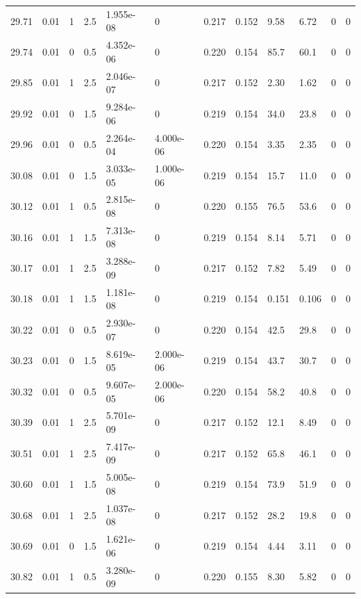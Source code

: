 \documentclass[preview]{standalone}
\begin{document}
{{{{{{{{{{{{{{\begin{tabular}{L{1.2cm}C{1.2cm} C{0.3cm}C{0.5cm} C{1.4cm}C{1.4cm} C{1.4cm}C{1.4cm} C{1.6cm}C{1.6cm} C{1.6cm}C{1.6cm}}
  29.71  &  0.01  & 1     & 2.5 &  1.955e-08  & 0  &  0.217&   0.152& 9.58 & 6.72   &  0 & 0  \\ 
  29.74  &  0.01  & 0     & 0.5 &  4.352e-06  & 0  &  0.220&   0.154& 85.7 & 60.1   &  0 & 0  \\ 
  29.85  &  0.01  & 1     & 2.5 &  2.046e-07  & 0  &  0.217&   0.152& 2.30 & 1.62   &  0 & 0  \\ 
  29.92  &  0.01  & 0     & 1.5 &  9.284e-06  & 0  &  0.219&   0.154& 34.0 & 23.8   &  0 & 0  \\ 
  29.96  &  0.01  & 0     & 0.5 &  2.264e-04  & 4.000e-06  &  0.220&   0.154& 3.35 & 2.35   &  0 & 0  \\ 
  30.08  &  0.01  & 0     & 1.5 &  3.033e-05  & 1.000e-06  &  0.219&   0.154& 15.7 & 11.0   &  0 & 0  \\ 
  30.12  &  0.01  & 1     & 0.5 &  2.815e-08  & 0  &  0.220&   0.155& 76.5 & 53.6   &  0 & 0  \\ 
  30.16  &  0.01  & 1     & 1.5 &  7.313e-08  & 0  &  0.219&   0.154& 8.14 & 5.71   &  0 & 0  \\ 
  30.17  &  0.01  & 1     & 2.5 &  3.288e-09  & 0  &  0.217&   0.152& 7.82 & 5.49   &  0 & 0  \\ 
  30.18  &  0.01  & 1     & 1.5 &  1.181e-08  & 0  &  0.219&   0.154& 0.151 & 0.106   &  0 & 0  \\ 
  30.22  &  0.01  & 0     & 0.5 &  2.930e-07  & 0  &  0.220&   0.154& 42.5 & 29.8   &  0 & 0  \\ 
  30.23  &  0.01  & 0     & 1.5 &  8.619e-05  & 2.000e-06  &  0.219&   0.154& 43.7 & 30.7   &  0 & 0  \\ 
  30.32  &  0.01  & 0     & 0.5 &  9.607e-05  & 2.000e-06  &  0.220&   0.154& 58.2 & 40.8   &  0 & 0  \\ 
  30.39  &  0.01  & 1     & 2.5 &  5.701e-09  & 0  &  0.217&   0.152& 12.1 & 8.49   &  0 & 0  \\ 
  30.51  &  0.01  & 1     & 2.5 &  7.417e-09  & 0  &  0.217&   0.152& 65.8 & 46.1   &  0 & 0  \\ 
  30.60  &  0.01  & 1     & 1.5 &  5.005e-08  & 0  &  0.219&   0.154& 73.9 & 51.9   &  0 & 0  \\ 
  30.68  &  0.01  & 1     & 2.5 &  1.037e-08  & 0  &  0.217&   0.152& 28.2 & 19.8   &  0 & 0  \\ 
  30.69  &  0.01  & 0     & 1.5 &  1.621e-06  & 0  &  0.219&   0.154& 4.44 & 3.11   &  0 & 0  \\ 
  30.82  &  0.01  & 1     & 0.5 &  3.280e-09  & 0  &  0.220&   0.155& 8.30 & 5.82   &  0 & 0  \\ 

\end{tabular}}}}}}}}}}}}}}}
\end{document}
